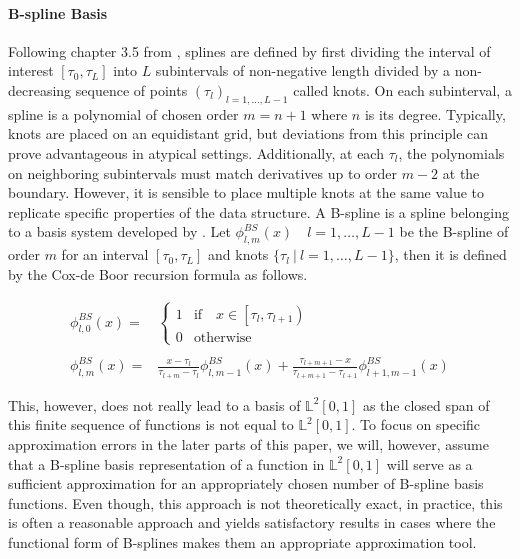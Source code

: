 \documentclass[11pt,twoside,a4paper]{article}
\begin{document}
	\paragraph{B-spline Basis} Following chapter 3.5 from \cite{ramsay_functional_2005}, splines are defined by first dividing the interval of interest $[\tau_0, \tau_L]$ into $L$ subintervals of non-negative length divided by a non-decreasing sequence of points $(\tau_l)_{l = 1,\dots, L-1}$ called knots. On each subinterval, a spline is a polynomial of chosen order $m = n+1$ where $n$ is its degree. Typically, knots are placed on an equidistant grid, but deviations from this principle can prove advantageous in atypical settings. Additionally, at each $\tau_l$, the polynomials on neighboring subintervals must match derivatives up to order $m-2$ at the boundary. However, it is sensible to place multiple knots at the same value to replicate specific properties of the data structure. A B-spline is a spline belonging to a basis system developed by \cite{de_boor_practical_1978}. Let $\phi_{l,m}^{BS}(x) \quad l = 1,\dots,L-1$ be the B-spline of order $m$ for an interval $[\tau_0, \tau_L]$ and knots $\{\tau_l \: \vert \: l = 1,\dots, L-1\}$, then it is defined by the Cox-de Boor recursion formula as follows. 
	
	\begin{equation}
		\begin{split}
			\phi_{l,0}^{BS}(x) = &
			\begin{cases}
				1 & \text{if} \quad x \in \left[\tau_l, \tau_{l+1}\right)\\
				0 & \text{otherwise}
			\end{cases}\\ \\
			\phi_{l,m}^{BS}(x) = &\frac{x - \tau_l}{\tau_{l+m} - \tau_l} \phi_{l,m-1}^{BS}(x) + \frac{\tau_{l+m+1} - x}{\tau_{l+m+1} - \tau_{l+1}} \phi_{l+1,m-1}^{BS}(x)
		\end{split}
	\end{equation}
	
	This, however, does not really lead to a basis of $\mathbb{L}^2[0,1]$ as the closed span of this finite sequence of functions is not equal to $\mathbb{L}^2[0,1]$. To focus on specific approximation errors in the later parts of this paper, we will, however, assume that a B-spline basis representation of a function in $\mathbb{L}^2[0,1]$ will serve as a sufficient approximation for an appropriately chosen number of B-spline basis functions. 
	Even though, this approach is not theoretically exact, in practice, this is often a reasonable approach and yields satisfactory results in cases where the functional form of B-splines makes them an appropriate approximation tool. 
\end{document}
